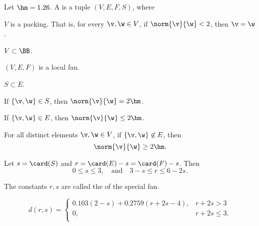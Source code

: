 \begin{definition}
Let $\hm = 1.26$.
A  is a tuple $(V,E,F,S)$, where
\begin{description}
\item {} $V$ is a packing.  That is, for every $\v,\w\in
V$, if $\norm{\v}{\w}<2$, then $\v=\w$.
\item {} $V\subset \BB$.
\item {} $(V,E,F)$ is a local fan.
\item {} $S\subset E$.
\item {} If $\{\v,\w\}\in S$, then $\norm{\v}{\w}=2\hm$.
\item {} If $\{\v,\w\}\in E$, then $\norm{\v}{\w}\le 2\hm$.
\item {} For all distinct elements $\v,\w\in V$, if
$\{\v,\w\}\not\in E$, then \begin{displaymath}\norm{\v}{\w}\ge
2\hm.\end{displaymath}
\item {} %
Let      $s=\card(S)$ and $r=\card(E) - s = \card(F)-s$.  Then
\begin{displaymath}0\le s \le 3,\quad\text{and}\quad3-s \le r \le 6 -
2s.\end{displaymath}
\end{description}
The constants $r,s$ are called the  of the special
fan.
\end{definition}


\begin{definition}[d]
\begin{displaymath}d(r,s) = \begin{cases}
0.103 (2-s) + 0.2759 (r+2s-4), & r + 2s > 3\\
0, & r + 2s \le 3.\\
\end{cases}\end{displaymath}
\end{definition}

